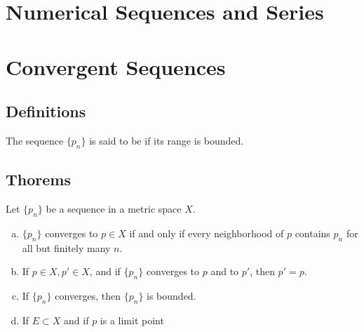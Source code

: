 \section{Numerical Sequences and Series}

\section{Convergent Sequences}
\subsection{Definitions}

\begin{deff}
	The sequence $\{p_n\}$ is said to be {} if its range is bounded.
\end{deff}

\subsection{Thorems}
\begin{thm}\label{thm:convergent seq}
	Let $\{p_n\}$ be a sequence in a metric space $X$.
	\begin{enumerate}[(a)]
		\item $\{p_n\}$ converges to $p \in X$ if and only if every neighborhood of $p$ contains $p_n$ for all but finitely many $n$.
		\item If $p \in X, p' \in X$, and if $\{p_n\}$ converges to $p$ and to $p'$, then $p'=p$.
		\item If $\{p_n\}$ converges, then $\{p_n\}$ is bounded.
		\item If $E \subset X$ and if $p$ is a limit point %
	\end{enumerate}
\end{thm}

